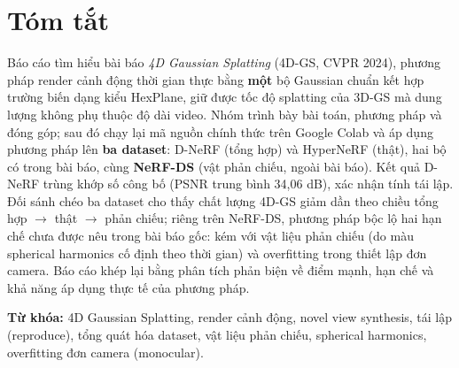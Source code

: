 \documentclass[a4paper]{report}
\makeatletter
\def\@makeschapterhead#1{%
  \vspace*{22.9\p@}%
  {\parindent \z@ \raggedright \normalfont
    \interlinepenalty\@M
    \huge \bfseries  #1\par\nobreak
    \vskip 39.9\p@
  }}
\makeatother
\begin{document}
\chapter*{Tóm tắt}

Báo cáo tìm hiểu bài báo \textit{4D Gaussian Splatting} (4D-GS, CVPR 2024), phương
pháp render cảnh động thời gian thực bằng \textbf{một} bộ Gaussian chuẩn kết hợp trường
biến dạng kiểu HexPlane, giữ được tốc độ splatting của 3D-GS mà dung lượng không phụ
thuộc độ dài video. Nhóm trình bày bài toán, phương pháp và đóng góp; sau đó chạy lại
mã nguồn chính thức trên Google Colab và áp dụng phương pháp lên \textbf{ba dataset}:
D-NeRF (tổng hợp) và HyperNeRF (thật), hai bộ có trong bài báo, cùng \textbf{NeRF-DS}
(vật phản chiếu, ngoài bài báo). Kết quả D-NeRF trùng khớp số công bố (PSNR trung bình
34,06 dB), xác nhận tính tái lập. Đối sánh chéo ba dataset cho thấy chất lượng 4D-GS
giảm dần theo chiều tổng hợp $\to$ thật $\to$ phản chiếu; riêng trên NeRF-DS, phương
pháp bộc lộ hai hạn chế chưa được nêu trong bài báo gốc: kém với vật liệu phản chiếu
(do màu spherical harmonics cố định theo thời gian) và overfitting trong thiết lập đơn
camera. Báo cáo khép lại bằng phân tích phản biện về điểm mạnh, hạn chế và khả năng
áp dụng thực tế của phương pháp.

\textbf{Từ khóa:} 4D Gaussian Splatting, render cảnh động, novel view synthesis,
tái lập (reproduce), tổng quát hóa dataset, vật liệu phản chiếu, spherical harmonics, overfitting đơn camera (monocular).

\clearpage

\begingroup
\setlength{\parskip}{0pt}
{}
\tableofcontents
\endgroup
\clearpage

\begingroup
\setlength{\parskip}{0pt}
\renewcommand{\listfigurename}{Danh sách hình vẽ}
\renewcommand{\listtablename}{Danh sách bảng}
{}
\listoffigures
\clearpage
{}
{}
\listoftables
\endgroup

\clearpage
{}

\makeatletter
\def\@makeschapterhead#1{%
  \vspace*{-9.9\p@}%
  {\parindent \z@ \raggedright \normalfont
    \interlinepenalty\@M
    \LARGE \bfseries  #1\par\nobreak
    \vskip 2.7\p@
  }}
\makeatother
\end{document}
